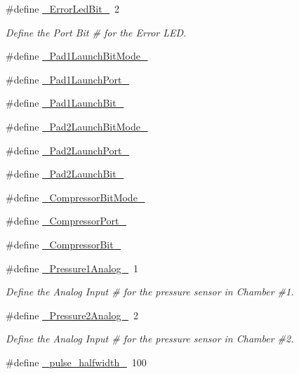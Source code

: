 \begin{DoxyCompactItemize}
\#define \hyperlink{launchPad_8ino_a5504a284db73f254a1d5871844f6987c}{\-\_\-\-Error\-Led\-Bit\-\_\-}~2
\begin{DoxyCompactList}\small\item\em \-Define the \-Port \-Bit \# for the \-Error \-L\-E\-D. \end{DoxyCompactList}\item 
\#define \hyperlink{launchPad_8ino_a440c530b55261878002ddb81888a0f6f}{\-\_\-\-Pad1\-Launch\-Bit\-Mode\-\_\-}
\item 
\#define \hyperlink{launchPad_8ino_a668c5ec668626e8f7ad9bfc2be75fa24}{\-\_\-\-Pad1\-Launch\-Port\-\_\-}
\item 
\#define \hyperlink{launchPad_8ino_a279a53b87a4dd94178c6353f1138145e}{\-\_\-\-Pad1\-Launch\-Bit\-\_\-}
\item 
\#define \hyperlink{launchPad_8ino_ac493d18a8ca788748c821e47f11bc23f}{\-\_\-\-Pad2\-Launch\-Bit\-Mode\-\_\-}
\item 
\#define \hyperlink{launchPad_8ino_af3068802cd6f1921c6f2926b3ea99689}{\-\_\-\-Pad2\-Launch\-Port\-\_\-}
\item 
\#define \hyperlink{launchPad_8ino_a5f31e10821954e78c91273154a01a9c1}{\-\_\-\-Pad2\-Launch\-Bit\-\_\-}
\item 
\#define \hyperlink{launchPad_8ino_a71f8d37be468b0d370427fea6df0c737}{\-\_\-\-Compressor\-Bit\-Mode\-\_\-}
\item 
\#define \hyperlink{launchPad_8ino_a60fea168d2c06a57a10f542ba5329af5}{\-\_\-\-Compressor\-Port\-\_\-}
\item 
\#define \hyperlink{launchPad_8ino_abfe6a39ff27c8d82ff6490d3226dcb7c}{\-\_\-\-Compressor\-Bit\-\_\-}
\item 
\#define \hyperlink{launchPad_8ino_a8dba5b7b5c1c1a33fdda248174d889bd}{\-\_\-\-Pressure1\-Analog\-\_\-}~1
\begin{DoxyCompactList}\small\item\em \-Define the \-Analog \-Input \# for the pressure sensor in \-Chamber \#1. \end{DoxyCompactList}\item 
\#define \hyperlink{launchPad_8ino_a4ab75fa969597ccee16103613f86127b}{\-\_\-\-Pressure2\-Analog\-\_\-}~2
\begin{DoxyCompactList}\small\item\em \-Define the \-Analog \-Input \# for the pressure sensor in \-Chamber \#2. \end{DoxyCompactList}\item 
\#define \hyperlink{launchPad_8ino_a9a8dc8e6e75e845a90d783b02b6be855}{\-\_\-pulse\-\_\-halfwidth\-\_\-}~100

\end{DoxyCompactItemize}
